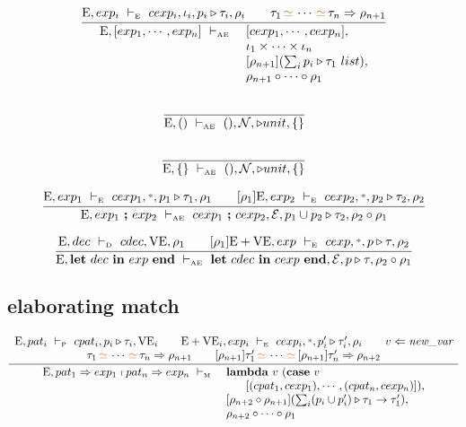 \documentclass[11pt,a4paper]{article}
\newcommand{\key}[1]{\textrm{\textbf{#1}}}
\newcommand{\qualtype}[2]{#1 \triangleright #2}
\newcommand{\unifylist}[3]{#1\,{\color{brown}{\simeq}}\,\cdots\,{\color{brown}{\simeq}}\,#2 \Rightarrow #3}
\newcommand{\braced}[1]{\{#1\}}
\newcommand{\wildcard}{{\color{gray}\scriptstyle\textbf{*}}}
\newcommand{\compose}[2]{#1 \circ #2}
\newcommand{\composeList}[2]{#1 \circ \cdots \circ #2}
\newcommand{\Env}  {\textrm{E}}
\newcommand{\VE}   {\textrm{VE}}
\newcommand{\Empty}{\braced{}}
\newcommand{\vdashD}  {\ \vdash_{\textrm{\tiny D}}\  }
\newcommand{\vdashE}  {\ \vdash_{\textrm{\tiny E}}\  }
\newcommand{\vdashAE} {\ \vdash_{\textrm{\tiny AE}}\ }
\newcommand{\vdashP}  {\ \vdash_{\textrm{\tiny P}}\  }
\newcommand{\vdashM}  {\ \vdash_{\textrm{\tiny M}}\  }
\newcommand{\xp} {\mathcal{E}}
\newcommand{\nxp}{\mathcal{N}}
\newcommand{\corenew}[1]{\textit{new\_#1}}
\begin{document}
\[
\cfrac
 {\Env,exp_i \vdashE cexp_i,\iota_i, \qualtype{p_i}{\tau_i},\rho_i \qquad
  \unifylist{\tau_1}{\tau_n}{\rho_{n+1}}}
 {\begin{array}{ll}
  \Env, [exp_1,\cdots,exp_n] \vdashAE
    & [cexp_1,\cdots,cexp_n], 	  			\\
    & \iota_1 \times \cdots \times \iota_n 	\\    
    & [\rho_{n+1}](\qualtype{\sum_i p_i}{\tau_1\ list}),\\
    & \composeList{\rho_{n+1}}{\rho_1} 		\\
   \end{array}} 
\]

\[
\cfrac
 {}
 {\Env, () \vdashAE (), \nxp, \qualtype{}{unit}, \Empty}
\]

\[
\cfrac
 {}
 {\Env, \braced{} \vdashAE (), \nxp, \qualtype{}{unit}, \Empty}
\]

\[
\cfrac
 {\Env,exp_1 \vdashE cexp_1,\wildcard,\qualtype{p_1}{\tau_1},\rho_1 \qquad 
  [\rho_1]\Env,exp_2 \vdashE cexp_2,\wildcard,\qualtype{p_2}{\tau_2},\rho_2}
 {\Env, exp_1\ \key{;}\ exp_2 \vdashAE 
    cexp_1\ \key{;}\ cexp_2, \xp, 
    \qualtype{p_1 \cup p_2}{\tau_2},
    \compose{\rho_2}{\rho_1}}
\]

\[
\cfrac
 {\Env,dec \vdashD cdec, \VE, \rho_1 \qquad
  [\rho_1]\Env+\VE, exp \vdashE cexp, \wildcard, \qualtype{p}{\tau}, \rho_2}
 {\Env,\key{let}\ dec\ \key{in}\ exp\ \key{end} \vdashAE 
    \key{let}\ cdec\ \key{in}\ cexp\ \key{end},
    \xp,
    \qualtype{p}{\tau},
    \compose{\rho_2}{\rho_1}}
\]

\subsection {elaborating match}
\[
\cfrac
 {\begin{array}{c}
  \Env,pat_i \vdashP cpat_i,\qualtype{p_i}{\tau_i},\VE_i     		        \qquad 
  \Env+\VE_i,exp_i \vdashE cexp_i,\wildcard,\qualtype{p_i'}{\tau_i'},\rho_i \qquad
  v \Leftarrow\corenew{var}                        		    \\
  \unifylist{\tau_1}{\tau_n}{\rho_{n+1}}            		\qquad
  \unifylist{[\rho_{n+1}]\tau_1'}{[\rho_{n+1}]\tau_n'}{\rho_{n+2}}
  \end{array}}
 {\begin{array}{ll}
  \Env, pat_1 \Rightarrow exp_1 \shortmid pat_n \Rightarrow exp_n \vdashM 
  & \key{lambda}\ v\ (\key{case}\ v\ 					\\
  & \hspace{4ex} [(cpat_1,cexp_1), \cdots, (cpat_n,cexp_n)]), \\
  & [\compose{\rho_{n+2}}{\rho_{n+1}}](\qualtype{\sum_i (p_i \cup p_i')}{\tau_1\to\tau_1'}), \\
  & \composeList{\rho_{n+2}}{\rho_1} \\
  \end{array}}
\]
\end{document}
